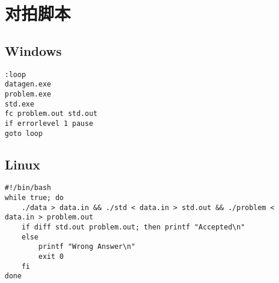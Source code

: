\section*{对拍脚本}
\subsection*{Windows}
\begin{verbatim}
:loop
datagen.exe
problem.exe
std.exe
fc problem.out std.out
if errorlevel 1 pause
goto loop
\end{verbatim}

\subsection*{Linux}
\begin{verbatim}
#!/bin/bash
while true; do
    ./data > data.in && ./std < data.in > std.out && ./problem < data.in > problem.out
    if diff std.out problem.out; then printf "Accepted\n"
    else
        printf "Wrong Answer\n"
        exit 0
    fi
done
\end{verbatim}